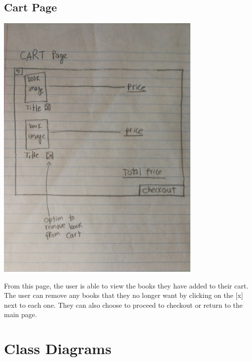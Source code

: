 \documentclass[12pt]{article}
\begin{document}
		\subsection{Cart Page}
		\includegraphics[width=10cm]{cart_page.eps}
		\par
		From this page, the user is able to view the books they have added to their cart. 
		The user can remove any books that they no longer want by clicking on the [x] next to each one. 
		They can also choose to proceed to checkout or return to the main page.

	\section{Class Diagrams}
\end{document}

